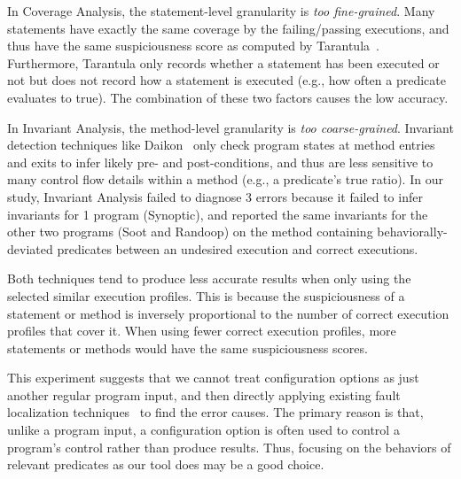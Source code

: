 In Coverage Analysis, the statement-level granularity is \textit{too fine-grained}.
Many statements have exactly the same coverage by the failing/passing executions,
and thus have the same suspiciousness score as computed by Tarantula~\cite{Jones:2002}.
Furthermore, Tarantula only records whether a
statement has been executed or not but does not record how a statement is 
executed (e.g., how often a predicate evaluates to true). The combination
of these two factors causes the low accuracy.


In Invariant Analysis, the method-level granularity is \textit{too coarse-grained}.
Invariant detection techniques like Daikon~\cite{Ernst:1999}
only check program states at method entries and exits to infer
likely pre- and post-conditions, and thus are less
sensitive to many control flow details within a method (e.g., a predicate's
true ratio). In our study, Invariant Analysis failed to diagnose 3
errors because it failed to infer invariants for 1 program (Synoptic),
and reported the same invariants for the other two programs (Soot and Randoop)
on the method containing behaviorally-deviated predicates between an undesired execution and correct executions.

Both techniques tend to produce less accurate results when only
using the selected similar execution profiles. This is because
the suspiciousness of a statement or method
is inversely proportional to the number of correct execution profiles that cover
it. When using fewer correct execution profiles,
more statements or methods would have the same suspiciousness scores.





This experiment suggests that we cannot
treat configuration options as just another regular program input,
and then directly applying existing 
fault localization techniques~\cite{Jones:2002, McCamant:2003} to
find the error causes. 
The primary reason is that, unlike a program input,
a configuration option is often used to control a
program's control rather than produce results. 
Thus, focusing on the behaviors of relevant predicates as our tool does
 may be a good choice.
